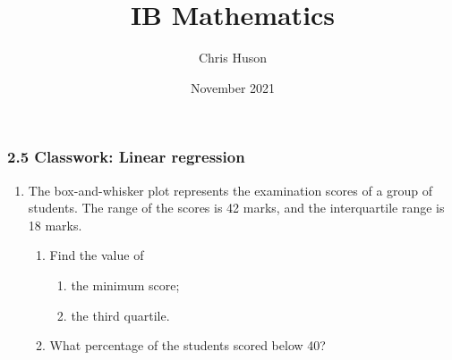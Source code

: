 \documentclass[12pt, twoside]{article}
\title{IB Mathematics}
\author{Chris Huson}
\date{November 2021}
\begin{document}
\subsubsection*{2.5 Classwork: Linear regression}
\begin{enumerate}
\item The box-and-whisker plot represents the examination scores of a group of students. The range of the scores is 42 marks, and the interquartile range is 18 marks.
  \begin{center}
  \end{center}
  \begin{enumerate}
    \item Find the value of
    \begin{enumerate}
      \item the minimum score; \vspace{1cm}
      \item the third quartile. 
    \end{enumerate} \vspace{0.5cm}
    \item What percentage of the students scored below 40?
  \end{enumerate}


\end{enumerate}
\end{document}
